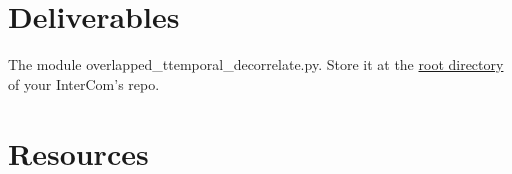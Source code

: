 \section{Deliverables}

The module overlapped\_ttemporal\_decorrelate.py. Store it at the
\href{https://github.com/Tecnologias-multimedia/intercom}{root
  directory} of your InterCom's repo.

\section{Resources}



\begin{comment}

  The Figure~\ref{fig:transform_coding} shows the stages that are
  tipycally involved in a transform-based signal compression system.

\begin{figure}
  \begin{center}
\begin{verbatim}
   s   +---+   w    +---+   k    +---+    c
 ----->| T |------->| Q |------->| E |-----------+
  (s)  +---+  (s)   +---+  (~s)  +---+   (~s)    |
samples   coefficients   indexes      code-words ~
                                                 :
                                                 ~
   ~s  +---+    w   +---+   k    +---+           |
 <-----| t |<-------| q |<-------| D |<----------+
  (~s) +---+  (~s)  +---+  (~s)  +---+
approx.    quantized     indexes
samples   coefficients
\end{verbatim}                
  \end{center}
  \caption{Common data-flow used un Transform Coding. $s$ represents
    the signal to compress, $\tilde{s}$ the lossy version of the
    reconstructed signal, $T$ the (forward) transform (which takes blocks of
    samples) producing blocks of coefficients $w$, $Q$ the scalar
    quantization stage (which takes single coefficients) producing
    quantization indexes $k$, $E$ the entropy encoder (which in our
    case (DEFLATE) works with blocks of coefficients) producing
    code-words $c$, $D$ the entropy decoder, $q$ the decuantization
    stage, and $t$ the inverse (or backward) transform. PCM stands for Puse Code
    Modulation and DEFLATE is the technique used to find a compact
    representation of the quantized coefficients.}
  \label{fig:transform_coding}
\end{figure}
\end{comment}

